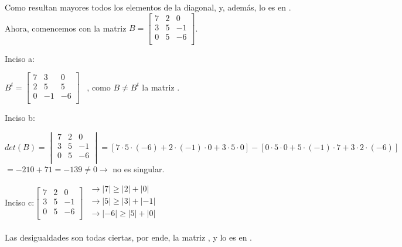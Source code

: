 \documentclass[11pt]{article}
\begin{document}
	Como resultan mayores todos los elementos de la diagonal,  y, además, lo es en .\\
	
	Ahora, comencemos con la matriz $B=\begin{bmatrix}
		7 & 2 & 0 \\
		3 & 5 & -1 \\
		0 & 5 & -6 \\
	\end{bmatrix}$.
	
	Inciso a:
	
	$B^t=\begin{bmatrix}
		7 & 3 & 0 \\
		2 & 5 & 5 \\
		0 & -1 & -6 \\
	\end{bmatrix} \;\;\;$, como $B\ne B^t$ la matriz .

	Inciso b:
	
	$det(B)=\begin{vmatrix}
		7 & 2 & 0 \\
		3 & 5 & -1 \\
		0 & 5 & -6 \\
	\end{vmatrix} = [7 \cdot 5 \cdot (-6) + 2 \cdot (-1) \cdot 0 + 3 \cdot 5 \cdot 0] - [0 \cdot 5 \cdot 0 + 5 \cdot (-1) \cdot 7 + 3 \cdot 2 \cdot (-6)]$\\
	$= -210 + 71 = -139 \ne 0 \rightarrow $ no es singular.
	
	Inciso c:$
	\begin{bmatrix}
		7 & 2 & 0 \\
		3 & 5 & -1 \\
		0 & 5 & -6 \\
	\end{bmatrix}$
	$\begin{matrix}
	\rightarrow |7| \ge |2| + |0|\\
	\rightarrow |5| \ge |3| + |-1| \\
	\rightarrow |-6| \ge |5| + |0| \\
	\end{matrix}$

	Las desigualdades son todas ciertas, por ende, la matriz , y lo es en .\\
	
\end{document}
